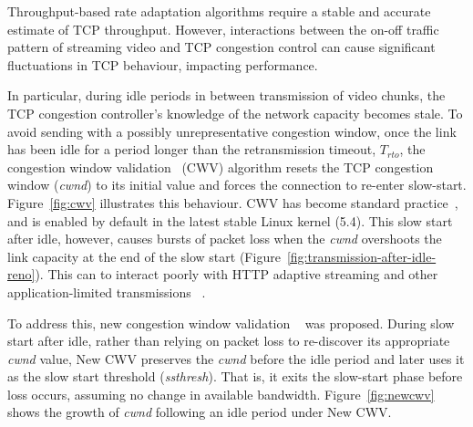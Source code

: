\documentclass[10pt, acmlarge]{acmart}
\begin{document}
Throughput-based rate adaptation algorithms require a stable and accurate estimate of 
TCP throughput. However, interactions between the on-off traffic pattern of streaming 
video and TCP congestion control can cause significant fluctuations in TCP behaviour,
 impacting performance.


In particular, during idle periods in between transmission of video chunks, 
the TCP congestion controller's knowledge of the network capacity becomes stale.
 To avoid sending with a possibly unrepresentative congestion window, once the link has 
 been idle for a period longer than the retransmission timeout, $T_{rto}$, 
 the congestion window validation~\cite{rfc2861-2000-padhye-congestion-window-validation}
(CWV) algorithm resets the TCP congestion window (\emph{cwnd}) to its initial value 
and forces the connection to re-enter slow-start. Figure~\ref{fig:cwv} 
illustrates this behaviour. CWV has become standard practice~\cite{rfc5681-congeston-control},
and is enabled by default in the latest stable Linux kernel (5.4).
This slow start after idle, however, causes bursts of packet loss when the \emph{cwnd}
overshoots the link capacity at the end of the slow start 
(Figure~\ref{fig:transmission-after-idle-reno}). This can to interact poorly with HTTP 
adaptive streaming and other application-limited transmissions
~\cite{Esteban-2012-Interactions-HTTP-TCP}.

To address this, new congestion window validation
~\cite{rfc7661-2015-fairhurst-new-cwnd-validation} was proposed. During slow start after idle,
 rather than relying on packet loss to re-discover its appropriate \emph{cwnd} value,
New CWV preserves the \emph{cwnd} before the idle period and later uses it as the slow 
start threshold (\emph{ssthresh}). That is, it exits the slow-start phase before loss occurs,
assuming no change in available bandwidth. Figure~\ref{fig:newcwv} shows the growth of
 \emph{cwnd} following an idle period under New CWV.
\end{document}
